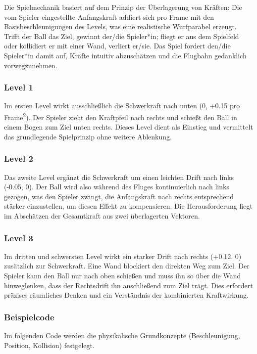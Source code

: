 Die Spielmechanik basiert auf dem Prinzip der Überlagerung von Kräften: Die vom Spieler eingestellte Anfangskraft addiert sich pro Frame mit den Basisbeschleunigungen des Levels, was eine realistische Wurfparabel erzeugt. Trifft der Ball das Ziel, gewinnt der/die Spieler*in; fliegt er aus dem Spielfeld oder kollidiert er mit einer Wand, verliert er/sie. Das Spiel fordert den/die Spieler*in damit auf, Kräfte intuitiv abzuschätzen und die Flugbahn gedanklich vorwegzunehmen.

\subsubsection{Level 1}
Im ersten Level wirkt ausschließlich die Schwerkraft nach unten (0, +0.15 pro Frame\textsuperscript{2}).
Der Spieler zieht den Kraftpfeil nach rechts und schießt den Ball in einem Bogen zum Ziel unten rechts.
Dieses Level dient als Einstieg und vermittelt das grundlegende Spielprinzip ohne weitere Ablenkung.

\subsubsection{Level 2}
Das zweite Level ergänzt die Schwerkraft um einen leichten Drift nach links (-0.05, 0).
Der Ball wird also während des Fluges kontinuierlich nach links gezogen, was den Spieler zwingt, die Anfangskraft nach rechts entsprechend stärker einzustellen, um diesen Effekt zu kompensieren.
Die Herausforderung liegt im Abschätzen der Gesamtkraft aus zwei überlagerten Vektoren.

\subsubsection{Level 3}
Im dritten und schwersten Level wirkt ein starker Drift nach rechts (+0.12, 0) zusätzlich zur Schwerkraft.
Eine Wand blockiert den direkten Weg zum Ziel.
Der Spieler kann den Ball nur nach oben schießen und muss ihn so über die Wand hinweglenken, dass der Rechtsdrift ihn anschließend zum Ziel trägt.
Dies erfordert präzises räumliches Denken und ein Verständnis der kombinierten Kraftwirkung.

\subsubsection{Beispielcode}
Im folgenden Code werden die physikalische Grundkonzepte (Beschleunigung, Position, Kollision) festgelegt.

